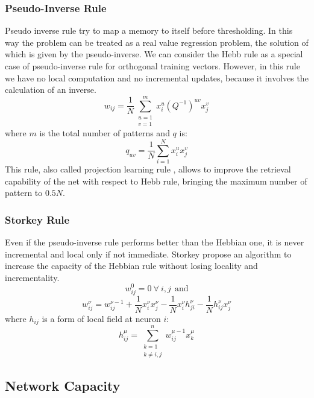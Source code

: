 \documentclass[letterpaper,twocolumn,10pt]{article}
\begin{document}
\subsubsection{Pseudo-Inverse Rule}
Pseudo inverse rule try to map a memory to itself before thresholding. In this way the problem can be treated as a real value regression problem, the solution of which is given by the pseudo-inverse. We can consider the Hebb rule as a special case of pseudo-inverse rule for orthogonal training vectors. However, in this rule we have no local computation and no incremental updates, because it involves the calculation of an inverse.
\begin{displaymath}
	w_{ij} = \frac{1}{N} \sum_{\substack{u=1\\v=1    }}^m x_i^u (Q^{-1})^{uv} x_j^v
\end{displaymath}
where $m$ is the total number of patterns and $q$ is:
\begin{displaymath}
	q_{uv} = \frac{1}{N} \sum_{i=1}^N x_i^u x_j^v
\end{displaymath}
This rule, also called projection learning rule \cite{personnazcoll}, allows to improve the retrieval capability of the net with respect to Hebb rule, bringing the maximum number of pattern to $0.5N$.

\subsubsection{Storkey Rule \cite{Storkey97increasingthe}}
Even if the pseudo-inverse rule performs better than the Hebbian one, it is never incremental and local only if not immediate. Storkey propose an algorithm to increase the capacity of the Hebbian rule without losing locality and incrementality.
\begin{displaymath}
	w_{ij}^0=0\ \forall\ i,j\ \ \text{and}
\end{displaymath}
\begin{displaymath}
	w_{ij}^{\nu} = w_{ij}^{\nu-1}+ \frac{1}{N} x_i^{\nu}x_j^{\nu} - \frac{1}{N} x_i^{\nu}h_{ji}^{\nu} - \frac{1}{N} h_{ij}^{\nu}x_j^{\nu}  
\end{displaymath}
where $h_{ij}$ is a form of local field at neuron $i$:
\begin{displaymath}
	h_{ij}^{\mu} = \sum_{\substack{k=1\\k\neq i,j}}^n w_{ij}^{\mu-1} x_k^{\mu}
\end{displaymath}

\subsection{Network Capacity}
\end{document}
